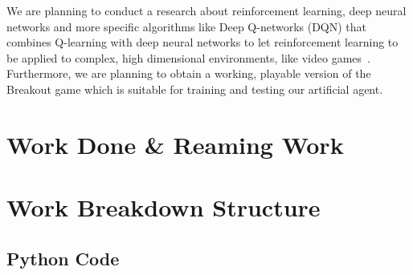 \documentclass[a4paper, 12pt, conference]{IEEEtran}
\begin{document}
We are planning to conduct a research about reinforcement learning, deep neural networks and more specific algorithms like Deep Q-networks (DQN) that combines Q-learning with deep neural networks to let reinforcement learning to be applied to complex, high dimensional environments, like video games~\autocite{openai}. Furthermore, we are planning to obtain a working, playable version of the Breakout game which is suitable for training and testing our artificial agent.

\section{Work Done \& Reaming Work}


\section{Work Breakdown Structure}

\printbibliography{}

\begin{appendices}
    \section{Python Code}
    
\end{appendices}
\end{document}
